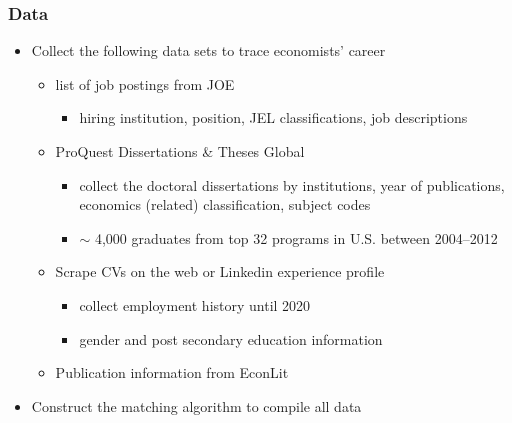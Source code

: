 \documentclass[11pt]{beamer}
\begin{document}
\begin{frame}[label=Data]
	\frametitle{Data}
	\begin{itemize}
		\item Collect the following data sets to trace economists' career
		\begin{itemize}
			\item list of job postings from JOE
			\begin{itemize}
				\item hiring institution, position, JEL classifications, job descriptions  
			\end{itemize}
		\vspace{1 mm}
			\item ProQuest Dissertations \& Theses Global
			\begin{itemize}
				\item collect the doctoral dissertations by institutions, year of publications, economics (related) classification, subject codes
				\item $\sim$ 4,000 graduates from top 32 programs in U.S. between 2004--2012 
			\end{itemize}
		\vspace{1 mm}				
			\item Scrape CVs on the web or Linkedin experience profile
			\begin{itemize}
				\item collect employment history until 2020
				\item gender and post secondary education information
			\end{itemize}
		\vspace{1 mm}
			\item Publication information from EconLit
		\end{itemize}
	\vspace{1 mm}
		\item Construct the matching algorithm to compile all data  \hyperlink{appendix}{}
	\end{itemize}
\end{frame}
\end{document}
